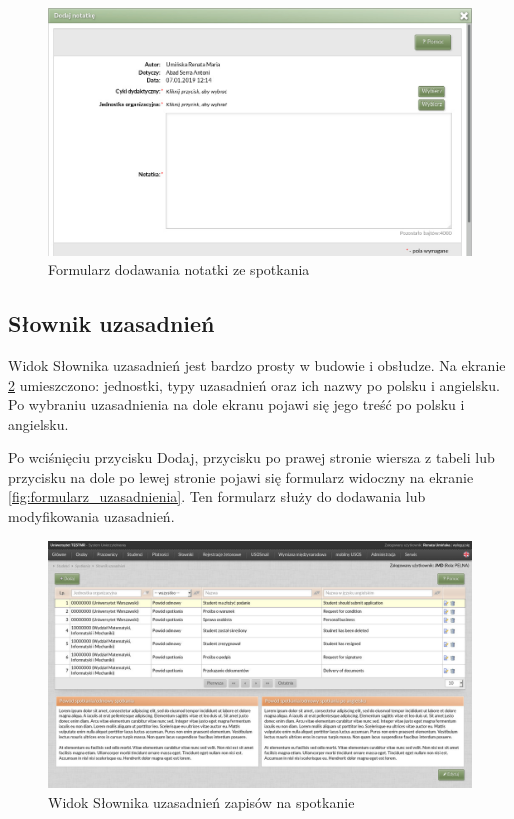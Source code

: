 \documentclass[licencjacka]{pracamgr}
\begin{document}
\begin{figure}[!]
  \includegraphics[width=\linewidth]{formularz_notatek.jpg}
  \caption{Formularz dodawania notatki ze spotkania}
  \label{fig:formularz_notatek}
\end{figure}

\subsection{Słownik uzasadnień}
Widok Słownika uzasadnień jest bardzo prosty w budowie i obsłudze. Na ekranie \ref{fig:uzasadnienia} umieszczono: jednostki, typy uzasadnień oraz ich nazwy po polsku i angielsku. Po wybraniu uzasadnienia na dole ekranu pojawi się jego treść po polsku i angielsku.

Po wciśnięciu przycisku \textsf{Dodaj}, przycisku po prawej stronie wiersza z tabeli lub przycisku na dole po lewej stronie pojawi się formularz 
widoczny na ekranie \ref{fig:formularz_uzasadnienia}. Ten formularz służy do dodawania lub modyfikowania uzasadnień.

\begin{figure}[!]
  \includegraphics[width=\linewidth]{widok_uzasadnien.jpg}
  \caption{Widok Słownika uzasadnień zapisów na spotkanie}
  \label{fig:uzasadnienia}
\end{figure}
\end{document}
